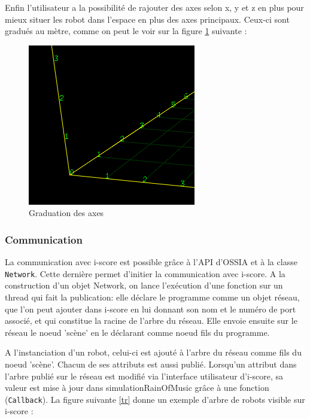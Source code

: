 Enfin l'utilisateur a la possibilité de rajouter des axes selon x, y et z en plus pour mieux situer les robot dans l'espace en plus des axes principaux. Ceux-ci sont gradués au mètre, comme on peut le voir sur la figure \ref{grad} suivante :
					
\begin{figure}[H]
\centering
\includegraphics[scale=0.6]{imgs/graduation}
\caption{Graduation des axes}
\label{grad}
\end{figure}

\subsubsection{Communication}

La communication avec i-score est possible grâce à l'API d'OSSIA et à la classe \verb|Network|. Cette dernière permet d'initier la communication avec i-score. A la construction d'un objet Network, on lance l'exécution d'une fonction sur un thread qui fait la publication: elle déclare le programme comme un objet réseau, que l'on peut ajouter dans i-score en lui donnant son nom et le numéro de port associé, et qui constitue la racine de l'arbre du réseau. Elle envoie ensuite sur le réseau le noeud 'scène' en le déclarant comme noeud fils du programme.

A l'instanciation d'un robot, celui-ci est ajouté à l'arbre du réseau comme fils du noeud 'scène'. Chacun de ses attributs est aussi publié. Lorsqu'un attribut dans l'arbre publié sur le réseau est modifié via l'interface utilisateur d'i-score, sa valeur est mise à jour dans simulationRainOfMusic grâce à une fonction (\verb|Callback|). La figure suivante \ref{tr} donne un exemple d'arbre de robots visible sur i-score :

